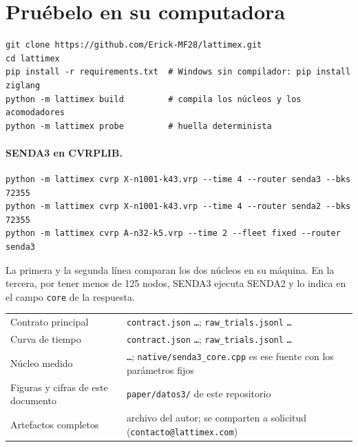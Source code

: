 \documentclass[11pt,a4paper]{article}
\newcommand{\sendados}{SENDA2}
\newcommand{\sendatres}{SENDA3}
\newcommand{\tsl}[1]{\texttt{\small #1}}
\begin{document}
\section{Pruébelo en su computadora}
\label{sec:pruebalo}

\begin{verbatim}
git clone https://github.com/Erick-MF28/lattimex.git
cd lattimex
pip install -r requirements.txt  # Windows sin compilador: pip install ziglang
python -m lattimex build         # compila los núcleos y los acomodadores
python -m lattimex probe         # huella determinista
\end{verbatim}

\paragraph{\sendatres{} en CVRPLIB.}
\begin{verbatim}
python -m lattimex cvrp X-n1001-k43.vrp --time 4 --router senda3 --bks 72355
python -m lattimex cvrp X-n1001-k43.vrp --time 4 --router senda2 --bks 72355
python -m lattimex cvrp A-n32-k5.vrp --time 2 --fleet fixed --router senda3
\end{verbatim}
La primera y la segunda línea comparan los dos núcleos en su máquina. En la tercera, por tener menos
de 125 nodos, \sendatres{} ejecuta \sendados{} y lo indica en el campo \tsl{core} de la respuesta.

\begin{reproducir}[: artefactos]
\small
\begin{tabular}{@{}p{5.2cm}p{9.3cm}@{}}
Contrato principal & \tsl{contract.json} \tsl{\HashContrato\ldots}; \tsl{raw\_trials.jsonl} \tsl{\HashRaw\ldots} \\
Curva de tiempo & \tsl{contract.json} \tsl{\HashCurva\ldots}; \tsl{raw\_trials.jsonl} \tsl{\HashRawCurva\ldots} \\
Núcleo medido & \tsl{\HashNucleo\ldots}; \tsl{native/senda3\_core.cpp} es ese fuente con los parámetros fijos \\
Figuras y cifras de este documento & \tsl{paper/datos3/} de este repositorio \\
Artefactos completos & archivo del autor; se comparten a solicitud (\tsl{contacto@lattimex.com}) \\
\end{tabular}
\end{reproducir}



\end{document}
